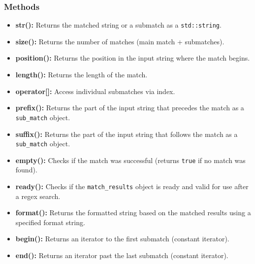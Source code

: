 \documentclass{report}
\begin{document}
    \subsubsection{Methods}
    \bigbreak \noindent 
    \begin{itemize}
        \item \textbf{str():} Returns the matched string or a submatch as a \texttt{std::string}.
        \item \textbf{size():} Returns the number of matches (main match + submatches).
        \item \textbf{position():} Returns the position in the input string where the match begins.
        \item \textbf{length():} Returns the length of the match.
        \item \textbf{operator[]:} Access individual submatches via index.
        \item \textbf{prefix():} Returns the part of the input string that precedes the match as a \texttt{sub\_match} object.
        \item \textbf{suffix():} Returns the part of the input string that follows the match as a \texttt{sub\_match} object.
        \item \textbf{empty():} Checks if the match was successful (returns \texttt{true} if no match was found).
        \item \textbf{ready():} Checks if the \texttt{match\_results} object is ready and valid for use after a regex search.
        \item \textbf{format():} Returns the formatted string based on the matched results using a specified format string.
        \item \textbf{begin():} Returns an iterator to the first submatch (constant iterator).
        \item \textbf{end():} Returns an iterator past the last submatch (constant iterator).
    \end{itemize}

    \pagebreak 
\end{document}
